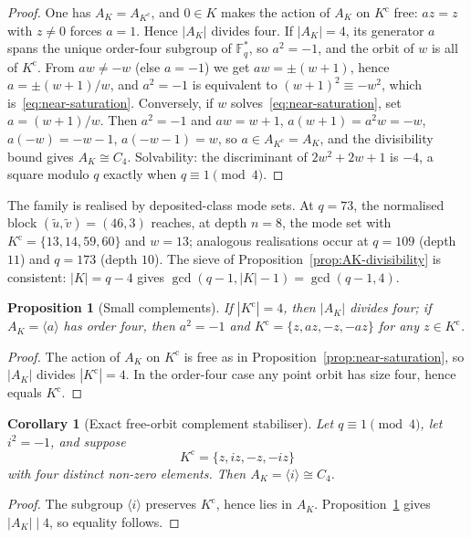 \documentclass[11pt,a4paper]{article}
\newtheorem{proposition}[theorem]{Proposition}
\newtheorem{corollary}[theorem]{Corollary}
\theoremstyle{definition}
\theoremstyle{remark}
\newcommand{\Fq}{\mathbb{F}_q}
\begin{document}
\begin{proof}
  One has $A_K=A_{K^{\mathrm{c}}}$, and $0\in K$ makes the action of $A_K$ on
  $K^{\mathrm{c}}$ free: $az=z$ with $z\ne0$ forces $a=1$.
  Hence $|A_K|$ divides four.
  If $|A_K|=4$, its generator $a$ spans the unique order-four subgroup of $\Fq^*$, so
  $a^2=-1$, and the orbit of $w$ is all of $K^{\mathrm{c}}$.
  From $aw\ne-w$ (else $a=-1$) we get $aw=\pm(w+1)$, hence $a=\pm(w+1)/w$, and $a^2=-1$ is
  equivalent to $(w+1)^2\equiv-w^2$, which is~\eqref{eq:near-saturation}.
  Conversely, if $w$ solves~\eqref{eq:near-saturation}, set $a=(w+1)/w$.
  Then $a^2=-1$ and
  $aw=w+1$, $a(w+1)=a^2w=-w$, $a(-w)=-w-1$, $a(-w-1)=w$,
  so $a\in A_{K^{\mathrm{c}}}=A_K$, and the divisibility bound gives $A_K\cong C_4$.
  Solvability: the discriminant of $2w^2+2w+1$ is $-4$, a square modulo $q$ exactly when
  $q\equiv1\pmod4$.
\end{proof}

The family is realised by deposited-class mode sets.
At $q=73$, the normalised block $(\widetilde u,\widetilde v)=(46,3)$ reaches, at depth
$n=8$, the mode set with $K^{\mathrm{c}}=\{13,14,59,60\}$ and $w=13$; analogous
realisations occur at $q=109$ (depth $11$) and $q=173$ (depth $10$).
The sieve of Proposition~\ref{prop:AK-divisibility} is consistent: $|K|=q-4$ gives
$\gcd(q-1,|K|-1)=\gcd(q-1,4)$.

\begin{proposition}[Small complements]
  \label{prop:small-complement}
  If $|K^{\mathrm{c}}|=4$, then $|A_K|$ divides four; if $A_K=\langle a\rangle$ has order
  four, then $a^2=-1$ and $K^{\mathrm{c}}=\{z,az,-z,-az\}$ for any
  $z\in K^{\mathrm{c}}$.
\end{proposition}

\begin{proof}
  The action of $A_K$ on $K^{\mathrm{c}}$ is free as in
  Proposition~\ref{prop:near-saturation}, so $|A_K|$ divides $|K^{\mathrm{c}}|=4$.
  In the order-four case any point orbit has size four, hence equals $K^{\mathrm{c}}$.
\end{proof}

\begin{corollary}[Exact free-orbit complement stabiliser]
  \label{cor:free-orbit-complement}
  Let $q\equiv1\pmod4$, let $i^2=-1$, and suppose
  \[
    K^{\mathrm{c}}=\{z,iz,-z,-iz\}
  \]
  with four distinct non-zero elements.
  Then $A_K=\langle i\rangle\cong C_4$.
\end{corollary}

\begin{proof}
  The subgroup $\langle i\rangle$ preserves $K^{\mathrm{c}}$, hence lies in $A_K$.
  Proposition~\ref{prop:small-complement} gives $|A_K|\mid4$, so equality follows.
\end{proof}
\end{document}
